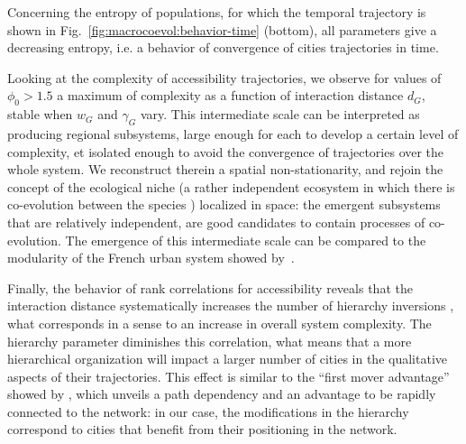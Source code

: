 Concerning the entropy of populations, for which the temporal trajectory is shown in Fig.~\ref{fig:macrocoevol:behavior-time} (bottom), all parameters give a decreasing entropy, i.e. a behavior of convergence of cities trajectories in time. 



Looking at the complexity of accessibility trajectories, we observe for values of $\phi_0 > 1.5$ a maximum of complexity as a function of interaction distance $d_G$, stable when $w_G$ and $\gamma_G$ vary. This intermediate scale can be interpreted as producing regional subsystems, large enough for each to develop a certain level of complexity, et isolated enough to avoid the convergence of trajectories over the whole system. We reconstruct therein a spatial non-stationarity, and rejoin the concept of the ecological niche (a rather independent ecosystem in which there is co-evolution between the species \citep{holland2012signals}) localized in space: the emergent subsystems that are relatively independent, are good candidates to contain processes of co-evolution. The emergence of this intermediate scale can be compared to the modularity of the French urban system showed by~\cite{berroir2017systemes}. 



Finally, the behavior of rank correlations for accessibility reveals that the interaction distance systematically increases the number of hierarchy inversions , what corresponds in a sense to an increase in overall system complexity. The hierarchy parameter diminishes this correlation, what means that a more hierarchical organization will impact a larger number of cities in the qualitative aspects of their trajectories. This effect is similar to the ``first mover advantage'' showed by \cite{levinson2011does}, which unveils a path dependency and an advantage to be rapidly connected to the network: in our case, the modifications in the hierarchy correspond to cities that benefit from their positioning in the network.



